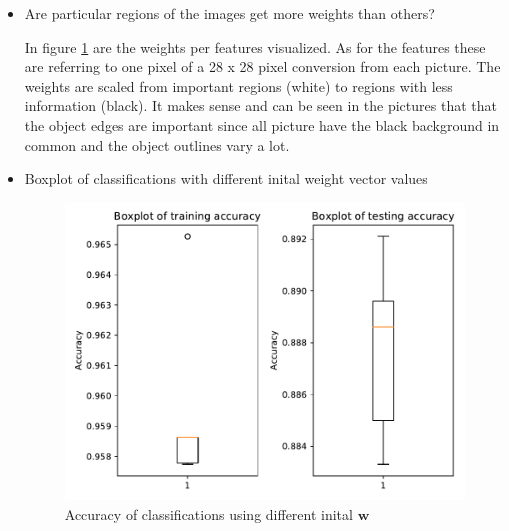 \documentclass{article}
\begin{document}
\begin{itemize}
    \item Are particular regions of the images get more weights than others?
      
        \begin{figure}[!ht]
		\end{figure}
	
	    In figure \ref{weights} are the weights per features visualized. As for the features these are referring to one pixel of a 28 x 28 pixel conversion from each picture. The weights are scaled from important regions (white) to regions with less information (black). It makes sense and can be seen in the pictures that that the object edges are important since all picture have the black background in common and the object outlines vary a lot.
	  
	\newpage    
    \item Boxplot of classifications with different inital weight vector values
    
        \begin{figure}[!ht]
		\centering
		\includegraphics[width=1 \textwidth]{./Figures/2_boxplot.pdf}
		\caption{Accuracy of classifications using different inital $\mathbf{w}$}
		\label{weights}
		\end{figure}
		

\end{itemize}
\end{document}
